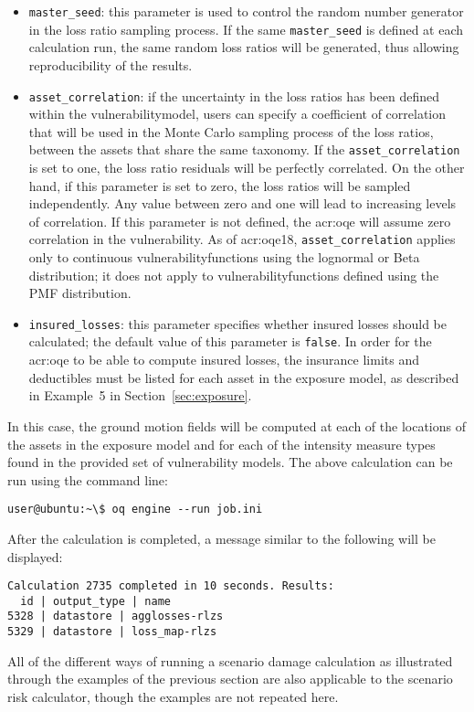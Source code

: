 \begin{itemize}

  \item \Verb+master_seed+: this parameter is used to control the random
    number generator in the loss ratio sampling process. If the same
    \Verb+master_seed+ is defined at each calculation run, the same random loss
    ratios will be generated, thus allowing reproducibility of the results.

  \item \Verb+asset_correlation+: if the uncertainty in the loss ratios
    has been defined within the \gls{vulnerabilitymodel}, users can specify
    a coefficient of correlation that will be used in the Monte Carlo sampling
    process of the loss ratios, between the assets that share the same
    \gls{taxonomy}. If the \Verb+asset_correlation+ is set to one,
    the loss ratio residuals will be perfectly correlated. On the other hand,
    if this parameter is set to zero, the loss ratios will be sampled
    independently. Any value between zero and one will lead to increasing
    levels of correlation. If this parameter is not defined, the
    \glsdesc{acr:oqe} will assume zero correlation in the vulnerability. As of
    \glsdesc{acr:oqe18}, \Verb+asset_correlation+ applies only to continuous
    \glspl{vulnerabilityfunction} using the lognormal or Beta distribution; 
    it does not apply to \glspl{vulnerabilityfunction} defined using the PMF
    distribution.

  \item \Verb+insured_losses+: this parameter specifies whether insured losses
    should be calculated; the default value of this parameter is \Verb+false+.
    In order for the \glsdesc{acr:oqe} to be able to compute insured losses, the
    insurance limits and deductibles must be listed for each asset in the 
    exposure model, as described in Example~5 in Section~\ref{sec:exposure}.

\end{itemize}

In this case, the ground motion fields will be computed at each of the
locations of the assets in the exposure model and for each of the intensity
measure types found in the provided set of vulnerability models. The above
calculation can be run using the command line:

\begin{verbatim}
user@ubuntu:~\$ oq engine --run job.ini
\end{verbatim}

After the calculation is completed, a message similar to the following will be
displayed:

\begin{verbatim}
Calculation 2735 completed in 10 seconds. Results:
  id | output_type | name
5328 | datastore | agglosses-rlzs
5329 | datastore | loss_map-rlzs
\end{verbatim}

All of the different ways of running a scenario damage calculation as
illustrated through the examples of the previous section are also applicable
to the scenario risk calculator, though the examples are not repeated here.